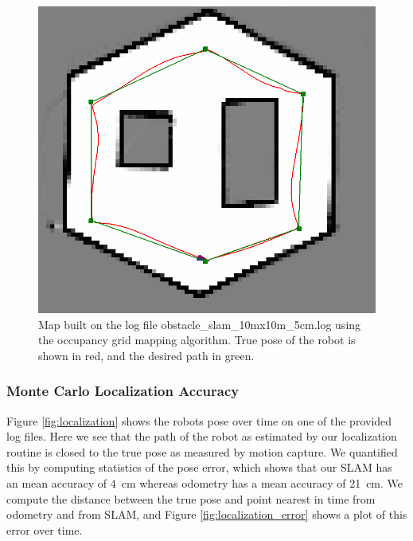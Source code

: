 \documentclass[journal]{IEEEtran}
\begin{document}
            \begin{figure}[H]
                \centering
                \includegraphics[width=0.65\linewidth]{obstacle_slam_10mx10m_5cm-map.png}
                \caption{Map built on the log file obstacle\_slam\_10mx10m\_5cm.log using the occupancy grid mapping algorithm. True pose of the robot is shown in red, and the desired path in green.}
                \label{fig:map}
            \end{figure}
    
        \subsubsection{Monte Carlo Localization Accuracy}
        
            Figure \ref{fig:localization} shows the robots pose over time on one of the provided log files. Here we see that the path of the robot as estimated by our localization routine is closed to the true pose as measured by motion capture. We quantified this by computing statistics of the pose error, which shows that our SLAM has an mean accuracy of \SI{4}{\centi\meter} whereas odometry has a mean accuracy of \SI{21}{\centi\meter}. We compute the distance between the true pose and point nearest in time from odometry and from SLAM, and Figure \ref{fig:localization_error} shows a plot of this error over time.
            
\end{document}
